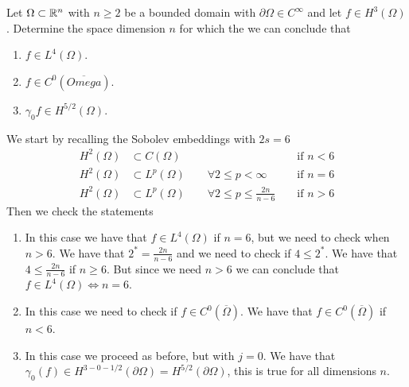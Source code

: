 \newpage
\begin{exercise}
    Let \(\Omega \subset \mathbb{R}^n\) with \(n \geq 2\) be a bounded domain with \(\partial \Omega \in C^\infty\) and let \(f \in H^3(\Omega)\). Determine the space dimension \(n\) for which the we can conclude that
    \begin{enumerate}
        \item \(f \in L^4(\Omega)\).
        \item \(f \in C^0(\overline{{Omega}})\).
        \item \(\gamma_0 f \in H^{5/2}(\Omega)\).
    \end{enumerate}
\end{exercise}
We start by recalling the Sobolev embeddings with \(2s = 6\)
\begin{align*}
    H^2(\Omega) &\subset C(\Omega) && \text{ if } n < 6 \\
    H^2(\Omega) &\subset L^p(\Omega) \qquad \forall 2 \leq p < \infty && \text{ if } n = 6 \\
    H^2(\Omega) &\subset L^p(\Omega) \qquad \forall 2 \leq p \leq \frac{2n}{n - 6} && \text{ if } n > 6
\end{align*}
Then we check the statements
\begin{enumerate}
    \item In this case we have that \(f \in L^4(\Omega)\) if \(n = 6\), but we need to check when \(n > 6\). We have that \(2^* = \frac{2n}{n - 6}\) and we need to check if \(4 \leq 2^*\). We have that \(4 \leq \frac{2n}{n - 6}\) if \(n \geq 6\). But since we need \(n > 6\) we can conclude that \(f \in L^4(\Omega) \iff n =6\).
    \item In this case we need to check if \(f \in C^0(\overline{\Omega})\). We have that \(f \in C^0(\overline{\Omega})\) if \(n < 6\). 
    \item In this case we proceed as before, but with \(j = 0\). We have that \(\gamma_0(f) \in H^{3 - 0 - 1/2}(\partial\Omega) = H^{5/2}(\partial\Omega)\), this is true for all dimensions \(n\).
\end{enumerate}


\newpage

